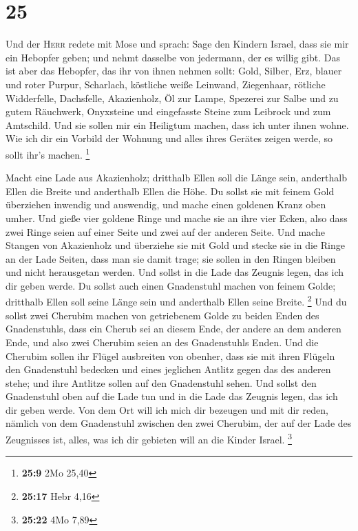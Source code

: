 \hypertarget{section-6}{%
\section{25}\label{section-6}}

 Und der \textsc{Herr} redete mit Mose und sprach:
 Sage den Kindern Israel, dass sie mir ein Hebopfer geben;
und nehmt dasselbe von jedermann, der es willig gibt.  Das
ist aber das Hebopfer, das ihr von ihnen nehmen sollt: Gold, Silber,
Erz,  blauer und roter Purpur, Scharlach, köstliche weiße
Leinwand, Ziegenhaar,  rötliche Widderfelle, Dachsfelle,
Akazienholz,  Öl zur Lampe, Spezerei zur Salbe und zu
gutem Räuchwerk,  Onyxsteine und eingefasste Steine zum
Leibrock und zum Amtschild.  Und sie sollen mir ein
Heiligtum machen, dass ich unter ihnen wohne.  Wie ich dir
ein Vorbild der Wohnung und alles ihres Gerätes zeigen werde, so sollt
ihr's machen. \footnote{\textbf{25:9} 2Mo 25,40}

 Macht eine Lade aus Akazienholz; dritthalb Ellen soll
die Länge sein, anderthalb Ellen die Breite und anderthalb Ellen die
Höhe.  Du sollst sie mit feinem Gold überziehen inwendig
und auswendig, und mache einen goldenen Kranz oben umher.
 Und gieße vier goldene Ringe und mache sie an ihre vier
Ecken, also dass zwei Ringe seien auf einer Seite und zwei auf der
anderen Seite.  Und mache Stangen von Akazienholz und
überziehe sie mit Gold  und stecke sie in die Ringe an
der Lade Seiten, dass man sie damit trage;  sie sollen in
den Ringen bleiben und nicht herausgetan werden.  Und
sollst in die Lade das Zeugnis legen, das ich dir geben werde.
 Du sollst auch einen Gnadenstuhl machen von feinem
Golde; dritthalb Ellen soll seine Länge sein und anderthalb Ellen seine
Breite. \footnote{\textbf{25:17} Hebr 4,16}  Und du
sollst zwei Cherubim machen von getriebenem Golde zu beiden Enden des
Gnadenstuhls,  dass ein Cherub sei an diesem Ende, der
andere an dem anderen Ende, und also zwei Cherubim seien an des
Gnadenstuhls Enden.  Und die Cherubim sollen ihr Flügel
ausbreiten von obenher, dass sie mit ihren Flügeln den Gnadenstuhl
bedecken und eines jeglichen Antlitz gegen das des anderen stehe; und
ihre Antlitze sollen auf den Gnadenstuhl sehen.  Und
sollst den Gnadenstuhl oben auf die Lade tun und in die Lade das Zeugnis
legen, das ich dir geben werde.  Von dem Ort will ich
mich dir bezeugen und mit dir reden, nämlich von dem Gnadenstuhl
zwischen den zwei Cherubim, der auf der Lade des Zeugnisses ist, alles,
was ich dir gebieten will an die Kinder Israel. \footnote{\textbf{25:22}
  4Mo 7,89}

